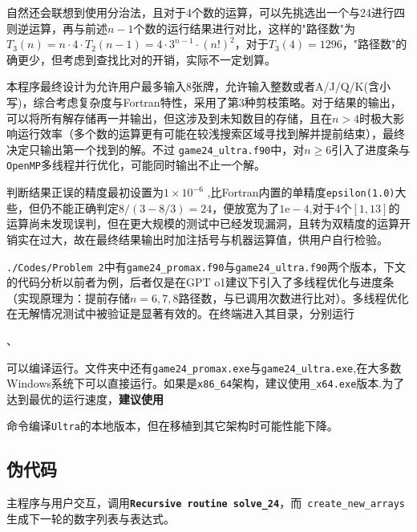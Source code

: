 自然还会联想到使用分治法，且对于4个数的运算，可以先挑选出一个与24进行四则逆运算，再与前述$n-1$个数的运行结果进行对比，这样的"路径数"为$T_3(n) = n \cdot 4 \cdot T_{2}(n-1) = 4 \cdot 3^{n-1} \cdot (n!)^2$，对于$T_3(4)=1296$，"路径数"的确更少，但考虑到查找比对的开销，实际不一定划算。

本程序最终设计为允许用户最多输入$8$张牌，允许输入整数或者A/J/Q/K(含小写)，综合考虑复杂度与Fortran特性，采用了第3种剪枝策略。对于结果的输出，可以将所有解存储再一并输出，但这涉及到未知数目的存储，且在$n>4$时极大影响运行效率（多个数的运算更有可能在较浅搜索区域寻找到解并提前结束），最终决定只输出第一个找到的解。不过 \texttt{game24\_ultra.f90}中，对$n\ge 6 $引入了进度条与\texttt{OpenMP}多线程并行优化，可能同时输出不止一个解。

判断结果正误的精度最初设置为$1 \times 10^{-6}$
,比Fortran内置的单精度\texttt{epsilon(1.0)}大些，但仍不能正确判定$8/(3-8/3) = 24$，便放宽为了$1 \mathrm{e-4} $,对于4个$[1,13]$的运算尚未发现误判，但在更大规模的测试中已经发现漏洞，且转为双精度的运算开销实在过大，故在最终结果输出时加注括号与机器运算值，供用户自行检验。

\texttt{./Codes/Problem 2}中有\texttt{game24\_promax.f90}与\texttt{game24\_ultra.f90}两个版本，下文的代码分析以前者为例，后者仅是在GPT o1建议下引入了多线程优化与进度条（实现原理为：提前存储$n=6,7,8$路径数，与已调用次数进行比对）。多线程优化在无解情况测试中被验证是显著有效的。在终端进入其目录，分别运行

\noindent {}、


\noindent 可以编译运行。文件夹中还有\texttt{game24\_promax.exe}与\texttt{game24\_ultra.exe},在大多数Windows系统下可以直接运行。如果是\texttt{x86\_64}架构，建议使用\texttt{\_x64.exe}版本.为了达到最优的运行速度，\textbf{建议使用}

\noindent {} 命令编译\texttt{Ultra}的本地版本，但在移植到其它架构时可能性能下降。

\subsection{伪代码}
\noindent 主程序与用户交互，调用\texttt{\textbf{Recursive routine solve\_24}}，而\texttt{ create\_new\_arrays}生成下一轮的数字列表与表达式。

